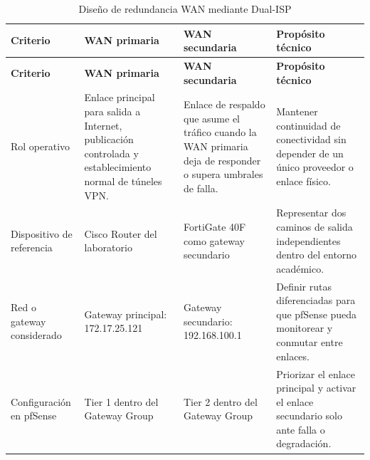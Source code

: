 \documentclass[11pt, a4paper, oneside]{report}
\begin{document}
\begin{xltabular}{\textwidth}{@{}|L{3.2cm}|L{4cm}|L{4cm}|X|@{}}
\caption{Diseño de redundancia WAN mediante Dual-ISP}
\label{tab:redundancia_wan_dual_isp} \\

\parbox[c][1.1cm][c]{\linewidth}{\centering\color{white}\bfseries\small Criterio} &
\parbox[c][1.1cm][c]{\linewidth}{\centering\color{white}\bfseries\small WAN primaria} &
\parbox[c][1.1cm][c]{\linewidth}{\centering\color{white}\bfseries\small WAN secundaria} &
\parbox[c][1.1cm][c]{\linewidth}{\centering\color{white}\bfseries\small Propósito técnico} \\ \hline
\endfirsthead

\parbox[c][1.1cm][c]{\linewidth}{\centering\color{white}\bfseries\small Criterio} &
\parbox[c][1.1cm][c]{\linewidth}{\centering\color{white}\bfseries\small WAN primaria} &
\parbox[c][1.1cm][c]{\linewidth}{\centering\color{white}\bfseries\small WAN secundaria} &
\parbox[c][1.1cm][c]{\linewidth}{\centering\color{white}\bfseries\small Propósito técnico} \\ \hline
\endhead

\hline
\endfoot

{\small Rol operativo} &
{\small Enlace principal para salida a Internet, publicación controlada y establecimiento normal de túneles VPN.} &
{\small Enlace de respaldo que asume el tráfico cuando la WAN primaria deja de responder o supera umbrales de falla.} &
{\small Mantener continuidad de conectividad sin depender de un único proveedor o enlace físico.} \\ \hline

{\small Dispositivo de referencia} &
{\small Cisco Router del laboratorio} &
{\small FortiGate 40F como gateway secundario} &
{\small Representar dos caminos de salida independientes dentro del entorno académico.} \\ \hline

{\small Red o gateway considerado} &
{\small Gateway principal: 172.17.25.121} &
{\small Gateway secundario: 192.168.100.1} &
{\small Definir rutas diferenciadas para que pfSense pueda monitorear y conmutar entre enlaces.} \\ \hline

{\small Configuración en pfSense} &
{\small Tier 1 dentro del Gateway Group} &
{\small Tier 2 dentro del Gateway Group} &
{\small Priorizar el enlace principal y activar el enlace secundario solo ante falla o degradación.} \\ \hline


\end{xltabular}
\end{document}
